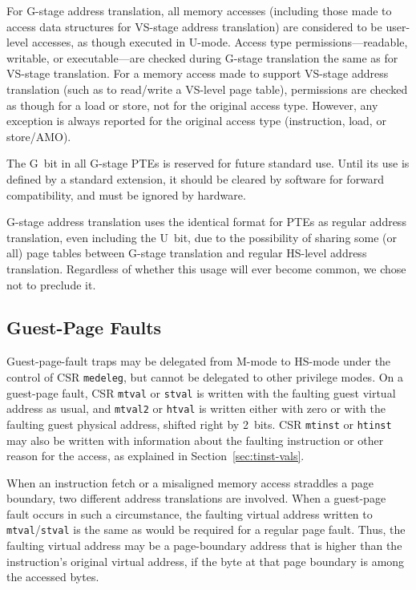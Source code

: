 For G-stage address translation, all memory accesses (including those
made to access data structures for VS-stage address translation) are considered
to be user-level accesses, as though executed in U-mode.
Access type permissions---readable, writable, or executable---are checked
during G-stage translation the same as for VS-stage
translation.
For a memory access made to support VS-stage address translation (such as to
read/write a VS-level page table), permissions are checked as though for a load
or store, not for the original access type.
However, any exception is always reported for the original access type
(instruction, load, or store/AMO).

The G~bit in all G-stage PTEs is reserved for future standard use.  Until its
use is defined by a standard extension, it should be cleared
by software for forward compatibility, and must be ignored by hardware.

\begin{commentary}
G-stage address translation uses the identical format for PTEs as
regular address translation, even including the U~bit, due to the
possibility of sharing some (or all) page tables between G-stage
translation and regular HS-level address translation.
Regardless of whether this usage will ever become common, we chose not to
preclude it.
\end{commentary}

\subsection{Guest-Page Faults}

Guest-page-fault traps may be delegated from M-mode to HS-mode under the
control of CSR {\tt medeleg}, but cannot be delegated to other privilege
modes.
On a guest-page fault, CSR {\tt mtval} or {\tt stval} is written with the
faulting guest virtual address as usual, and {\tt mtval2} or {\tt htval} is
written either with zero or with the faulting guest physical address,
shifted right by 2~bits.
CSR {\tt mtinst} or {\tt htinst} may also be written with information
about the faulting instruction or other reason for the access, as
explained in Section~\ref{sec:tinst-vals}.

When an instruction fetch or a misaligned memory access straddles a page
boundary, two different address translations are involved.
When a guest-page fault occurs in such a circumstance, the faulting
virtual address written to {\tt mtval}/{\tt stval} is the same as would
be required for a regular page fault.
Thus, the faulting virtual address may be a page-boundary address that is
higher than the instruction's original virtual address, if the byte at
that page boundary is among the accessed bytes.

